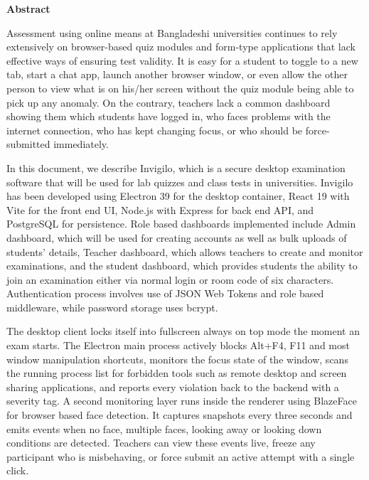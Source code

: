 \documentclass[12pt, a4paper]{report}
\newcommand{\blanklines}[1]{\vspace{#1\dimexpr 18pt\relax}}
\begin{document}
\begin{center}
  {\fontsize{16}{24}\bfseries Abstract}
\end{center}

\blanklines{2}

\begin{justify}
  {\fontsize{12}{18}\selectfont
    Assessment using online means at Bangladeshi universities continues to rely extensively on browser-based quiz modules and form-type applications that lack effective ways of ensuring test validity. It is easy for a student to toggle to a new tab, start a chat app, launch another browser window, or even allow the other person to view what is on his/her screen without the quiz module being able to pick up any anomaly. On the contrary, teachers lack a common dashboard showing them which students have logged in, who faces problems with the internet connection, who has kept changing focus, or who should be force-submitted immediately.

    In this document, we describe Invigilo, which is a secure desktop examination software that will be used for lab quizzes and class tests in universities. Invigilo has been developed using Electron 39 for the desktop container, React 19 with Vite for the front end UI, Node.js with Express for back end API, and PostgreSQL for persistence. Role based dashboards implemented include Admin dashboard, which will be used for creating accounts as well as bulk uploads of students' details, Teacher dashboard, which allows teachers to create and monitor examinations, and the student dashboard, which provides students the ability to join an examination either via normal login or room code of six characters. Authentication process involves use of JSON Web Tokens and role based middleware, while password storage uses bcrypt.

    The desktop client locks itself into fullscreen always on top mode the moment an exam starts. The Electron main process actively blocks Alt+F4, F11 and most window manipulation shortcuts, monitors the focus state of the window, scans the running process list for forbidden tools such as remote desktop and screen sharing applications, and reports every violation back to the backend with a severity tag. A second monitoring layer runs inside the renderer using BlazeFace for browser based face detection. It captures snapshots every three seconds and emits events when no face, multiple faces, looking away or looking down conditions are detected. Teachers can view these events live, freeze any participant who is misbehaving, or force submit an active attempt with a single click.

}
\end{justify}
\end{document}
